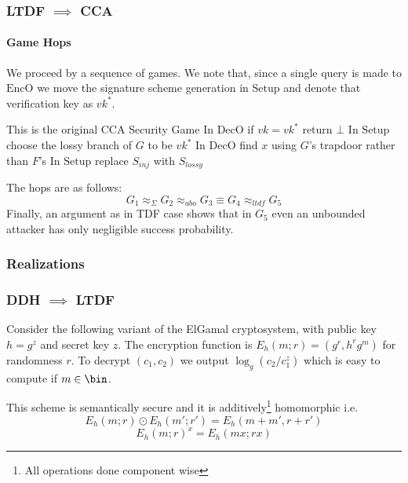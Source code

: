 \documentclass{beamer}
\begin{document}
\begin{frame}
    \frametitle{LTDF $\implies$ CCA}
    \framesubtitle{Game Hops}
    We proceed by a sequence of games. We note that, since a single query
    is made to $\mathrm{EncO}$ we move the signature scheme generation in
    $\mathrm{Setup}$ and denote that verification key as $vk^*$.
    \begin{gamedescription}[name=G]
        \describegame This is the original CCA Security Game
        \describegame In $\mathrm{DecO}$ if $vk=vk^*$ return $\bot$
        \describegame In $\mathrm{Setup}$ choose the lossy branch of $G$ to be $vk^*$
        \describegame In $\mathrm{DecO}$ find $x$ using $G$'s trapdoor rather than $F$'s
        \describegame In $\mathrm{Setup}$ replace $S_{inj}$ with $S_{lossy}$
    \end{gamedescription}
    The hops are as follows:
    \[ G_1 \approx_\Sigma G_2\approx_{abo} G_3 \equiv G_4 \approx_{ltdf} G_5 \]
    Finally, an argument as in TDF case shows that in $G_5$ even an unbounded attacker has only
    negligible success probability.
\end{frame}
\begin{frame}
    \frametitle{Realizations}

\end{frame}
\begin{frame}
    \frametitle{DDH $\implies$ LTDF}
    Consider the following variant of the ElGamal cryptosystem, with public key $h = g^z$ and secret key $z$.
    The encryption function is $E_h(m; r) = (g^r, h^r g^m)$ for randomness $r$. To decrypt $(c_1, c_2)$
    we output $\log_g(c_2/c_1^z)$ which is easy to compute if $m \in \bin$.

    This scheme is semantically secure and it is additively\footnote{All operations done component wise} homomorphic i.e.
    \[ E_h(m; r) \odot E_h(m'; r') = E_h(m + m', r + r')\]
    \[ E_h(m; r)^x = E_h(mx; rx) \]
\end{frame}
\end{document}
